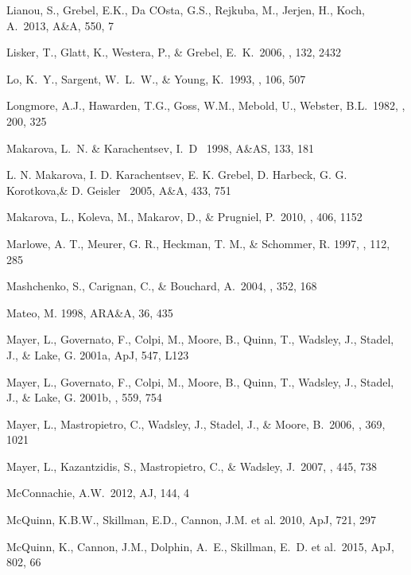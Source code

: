 \documentclass[12pt,onecolumn]{emulateapj}
\begin{document}
\begin{thebibliography}{}
Lianou, S., Grebel, E.K., Da COsta, G.S., Rejkuba, M., Jerjen, H., Koch, A.\ 2013, A\&A, 550, 7

Lisker, T., Glatt, K., Westera, P., \& Grebel, E.~K.\ 2006, \aj, 132, 2432

Lo, K.~Y., Sargent, W.~L.~W., \& Young, K.\ 1993, \aj, 106, 507 

Longmore, A.J., Hawarden, T.G., Goss, W.M., Mebold, U., Webster, B.L.\ 1982, \mnras, 200, 325

Makarova, L.~N. \& Karachentsev, I.~D \ 1998, A\&AS, 133, 181

L. N. Makarova, I. D. Karachentsev, E. K. Grebel, D. Harbeck, G. G. Korotkova,\&
D. Geisler \ 2005, A\&A, 433, 751

Makarova, L., Koleva, M., Makarov, D., \& Prugniel, P.\ 2010, \mnras, 406, 1152 

Marlowe, A. T., Meurer, G. R., Heckman, T. M., \& Schommer, R. 1997, 
\apjs , 112, 285

Mashchenko, S., Carignan, C., \& Bouchard, A.\ 2004, \mnras, 352, 168 

Mateo, M. 1998, ARA\&A, 36, 435

Mayer, L., Governato, F., Colpi, M., Moore, B., Quinn, T., Wadsley, J., 
Stadel, J., \& Lake, G. 2001a, ApJ, 547, L123

Mayer, L., Governato, F., Colpi, M., Moore, B., Quinn, T., Wadsley, J., 
Stadel, J., \& Lake, G. 2001b, \apj, 559, 754 

Mayer, L., Mastropietro, C., Wadsley, J., Stadel, J., \& 
   Moore, B.\ 2006, \mnras, 369, 1021

Mayer, L., Kazantzidis, S., Mastropietro, C., \& Wadsley, J.\ 2007, \nat, 445, 738 

McConnachie, A.W.\ 2012, AJ, 144, 4 

McQuinn, K.B.W., Skillman, E.D., Cannon, J.M. et al. 2010, ApJ, 721, 297 

McQuinn, K., Cannon, J.M., Dolphin, A.~E., Skillman, E.~D. et al.\ 2015, ApJ, 802, 66 


\end{thebibliography}
\end{document}

